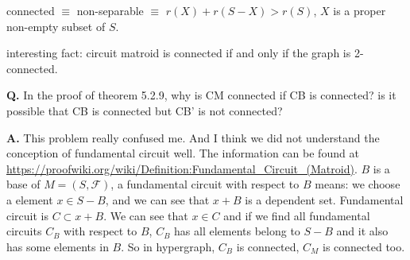 \documentclass[12pt]{article}
\DeclareRobustCommand{\mybox}[2][gray!20]{%
\begin{tcolorbox}[   %
        breakable,
        left=0pt,
        right=0pt,
        top=0pt,
        bottom=0pt,
        colback=#1,
        colframe=#1,
        width=\dimexpr\textwidth\relax, 
        enlarge left by=0mm,
        boxsep=5pt,
        arc=0pt,outer arc=0pt,
        ]
        #2
\end{tcolorbox}
}
\begin{document}
connected $\equiv$ non-separable $\equiv$ $r(X)+r(S-X)> r(S)$, $X$ is a proper non-empty subset of $S$. 

interesting fact: circuit matroid is connected if and only if the graph is 2-connected.

\mybox[green!20]{\textbf{Q.} In the proof of theorem 5.2.9, why is CM connected if CB is connected? is it possible that CB is connected but CB' is not connected? 

\textbf{A.}
This problem really confused me. And I think we did not understand the conception of fundamental circuit well. The information can be found at \url{https://proofwiki.org/wiki/Definition:Fundamental_Circuit_(Matroid)}. $B$ is a base of $M=(S,\mathcal{F})$, a fundamental circuit with respect to $B$ means: we choose a element $x \in S - B$, and we can see that $x + B$ is a dependent set. Fundamental circuit is $C \subset x + B$. We can see that $x \in C$ and if we find all fundamental circuits $C_B$ with respect to $B$, $C_B$ has all elements belong to $S - B$ and it also has some elements in $B$. So in hypergraph, $C_B$ is connected, $C_M$ is connected too.}
\end{document}
